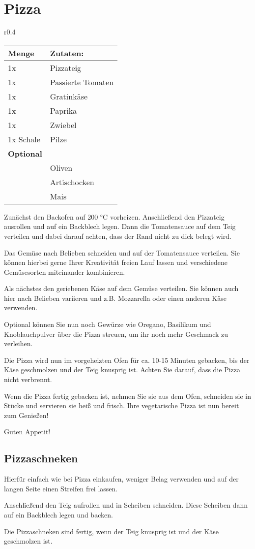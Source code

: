 \documentclass[../../book.tex]{subfiles}
\begin{document}
\section{Pizza}
\begin{wraptable}{r}{0.4\textwidth}
  \centering
  \begin{tabularx}{0.39\textwidth}{|l|X|}
    \toprule
    Menge & Zutaten: \\
    \midrule
    1x & Pizzateig \\
    \midrule
    1x & Passierte Tomaten \\
    \midrule
    1x & Gratinkäse\\
    \midrule
    1x & Paprika\\
    \midrule
    1x & Zwiebel\\
    \midrule
    1x Schale & Pilze\\
    \midrule
    \textbf{Optional} & \\
    \midrule
    & Oliven\\
    \midrule
    & Artischocken\\
    \midrule
    & Mais\\
    \bottomrule
  \end{tabularx}
\end{wraptable}
Zunächst den Backofen auf 200 °C vorheizen. Anschließend den Pizzateig ausrollen und auf ein Backblech legen. Dann die Tomatensauce auf dem Teig verteilen und dabei darauf achten, dass der Rand nicht zu dick belegt wird.

Das Gemüse nach Belieben schneiden und auf der Tomatensauce verteilen. Sie können hierbei gerne Ihrer Kreativität freien Lauf lassen und verschiedene Gemüsesorten miteinander kombinieren.

Als nächstes den geriebenen Käse auf dem Gemüse verteilen. Sie können auch hier nach Belieben variieren und z.B. Mozzarella oder einen anderen Käse verwenden.

Optional können Sie nun noch Gewürze wie Oregano, Basilikum und Knoblauchpulver über die Pizza streuen, um ihr noch mehr Geschmack zu verleihen.

Die Pizza wird nun im vorgeheizten Ofen für ca. 10-15 Minuten gebacken, bis der Käse geschmolzen und der Teig knusprig ist. Achten Sie darauf, dass die Pizza nicht verbrennt.

Wenn die Pizza fertig gebacken ist, nehmen Sie sie aus dem Ofen, schneiden sie in Stücke und servieren sie heiß und frisch. Ihre vegetarische Pizza ist nun bereit zum Genießen!

Guten Appetit!
\subsection{Pizzaschneken}

Hierfür einfach wie bei Pizza einkaufen, weniger Belag verwenden und auf der langen Seite einen Streifen frei lassen.

Anschließend den Teig aufrollen und in Scheiben schneiden. Diese Scheiben dann auf ein Backblech legen und backen.

Die Pizzaschneken sind fertig, wenn der Teig knusprig ist und der Käse geschmolzen ist.

\newpage
\end{document}
